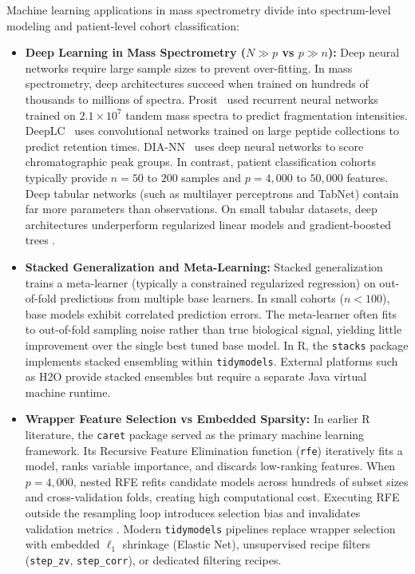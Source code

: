 \documentclass[11pt,oneside]{book}
\begin{document}
Machine learning applications in mass spectrometry divide into spectrum-level modeling and patient-level cohort classification:
\begin{itemize}
    \item \textbf{Deep Learning in Mass Spectrometry ($N \gg p$ vs $p \gg n$):} Deep neural networks require large sample sizes to prevent over-fitting. In mass spectrometry, deep architectures succeed when trained on hundreds of thousands to millions of spectra. Prosit~\cite{gessulat2019prosit} used recurrent neural networks trained on $2.1 \times 10^7$ tandem mass spectra to predict fragmentation intensities. DeepLC~\cite{bouwmeester2021deeplc} uses convolutional networks trained on large peptide collections to predict retention times. DIA-NN~\cite{demichev2020diann} uses deep neural networks to score chromatographic peak groups. In contrast, patient classification cohorts typically provide $n = 50$ to $200$ samples and $p = 4{,}000$ to $50{,}000$ features. Deep tabular networks (such as multilayer perceptrons and TabNet) contain far more parameters than observations. On small tabular datasets, deep architectures underperform regularized linear models and gradient-boosted trees \cite{grinsztajn2022tree}.
    
    \item \textbf{Stacked Generalization and Meta-Learning:} Stacked generalization~\cite{wolpert1992stacked, breiman1996stacked, vanderLaan2007super} trains a meta-learner (typically a constrained regularized regression) on out-of-fold predictions from multiple base learners. In small cohorts ($n < 100$), base models exhibit correlated prediction errors. The meta-learner often fits to out-of-fold sampling noise rather than true biological signal, yielding little improvement over the single best tuned base model. In R, the \texttt{stacks} package implements stacked ensembling within \texttt{tidymodels}. External platforms such as H2O provide stacked ensembles but require a separate Java virtual machine runtime.
    
    \item \textbf{Wrapper Feature Selection vs Embedded Sparsity:} In earlier R literature, the \texttt{caret} package \cite{kuhn2013applied} served as the primary machine learning framework. Its Recursive Feature Elimination function (\texttt{rfe}) iteratively fits a model, ranks variable importance, and discards low-ranking features. When $p = 4{,}000$, nested RFE refits candidate models across hundreds of subset sizes and cross-validation folds, creating high computational cost. Executing RFE outside the resampling loop introduces selection bias and invalidates validation metrics \cite{ambroise2002selection}. Modern \texttt{tidymodels} pipelines replace wrapper selection with embedded $\ell_1$ shrinkage (Elastic Net), unsupervised recipe filters (\texttt{step\_zv}, \texttt{step\_corr}), or dedicated filtering recipes.
\end{itemize}
\end{document}
